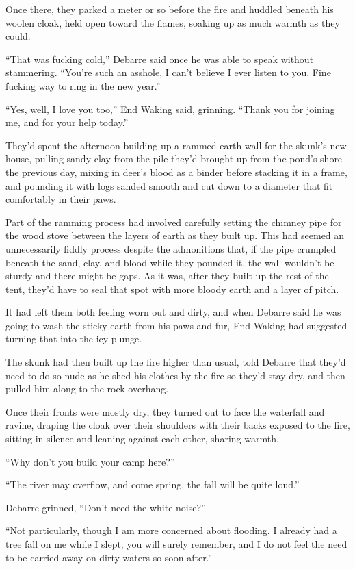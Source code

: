 Once there, they parked a meter or so before the fire and huddled beneath his woolen cloak, held open toward the flames, soaking up as much warmth as they could.

``That was fucking cold,'' Debarre said once he was able to speak without stammering. ``You're such an asshole, I can't believe I ever listen to you. Fine fucking way to ring in the new year.''

``Yes, well, I love you too,'' End Waking said, grinning. ``Thank you for joining me, and for your help today.''

They'd spent the afternoon building up a rammed earth wall for the skunk's new house, pulling sandy clay from the pile they'd brought up from the pond's shore the previous day, mixing in deer's blood as a binder before stacking it in a frame, and pounding it with logs sanded smooth and cut down to a diameter that fit comfortably in their paws.

Part of the ramming process had involved carefully setting the chimney pipe for the wood stove between the layers of earth as they built up. This had seemed an unnecessarily fiddly process despite the admonitions that, if the pipe crumpled beneath the sand, clay, and blood while they pounded it, the wall wouldn't be sturdy and there might be gaps. As it was, after they built up the rest of the tent, they'd have to seal that spot with more bloody earth and a layer of pitch.

It had left them both feeling worn out and dirty, and when Debarre said he was going to wash the sticky earth from his paws and fur, End Waking had suggested turning that into the icy plunge.

The skunk had then built up the fire higher than usual, told Debarre that they'd need to do so nude as he shed his clothes by the fire so they'd stay dry, and then pulled him along to the rock overhang.

Once their fronts were mostly dry, they turned out to face the waterfall and ravine, draping the cloak over their shoulders with their backs exposed to the fire, sitting in silence and leaning against each other, sharing warmth.

``Why don't you build your camp here?''

``The river may overflow, and come spring, the fall will be quite loud.''

Debarre grinned, ``Don't need the white noise?''

``Not particularly, though I am more concerned about flooding. I already had a tree fall on me while I slept, you will surely remember, and I do not feel the need to be carried away on dirty waters so soon after.''

